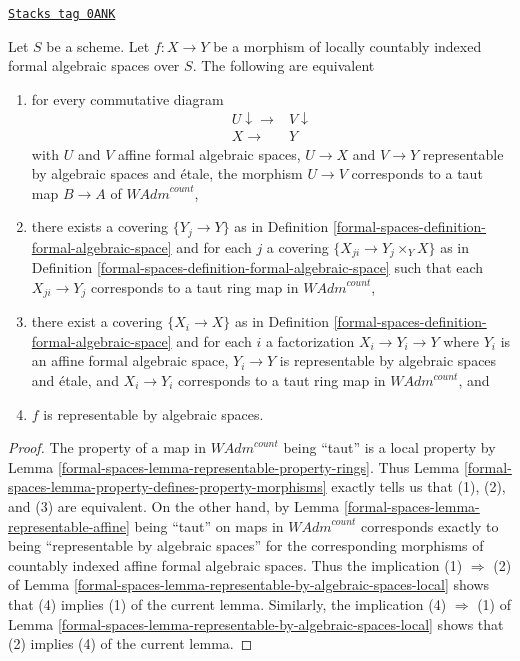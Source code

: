 \begin{lemma}
\label{formal-spaces-lemma-representable-local-property}
\href{https://stacks.math.columbia.edu/tag/0ANK}{\texttt{Stacks tag 0ANK}}

Let $S$ be a scheme. Let $f : X \to Y$ be a morphism of
locally countably indexed formal algebraic spaces over $S$.
The following are equivalent
\begin{enumerate}
\item for every commutative diagram
$$
\begin{array}{cc}U \downarrow\longrightarrow & V \downarrow \\ X \longrightarrow & Y\end{array}
$$
with $U$ and $V$ affine formal algebraic spaces, $U \to X$ and $V \to Y$
representable by algebraic spaces and \'etale, the morphism $U \to V$
corresponds to a taut map $B \to A$ of $\textit{WAdm}^{count}$,
\item there exists a covering $\{Y_j \to Y\}$ as in
Definition \ref{formal-spaces-definition-formal-algebraic-space} and for each $j$
a covering $\{X_{ji} \to Y_j \times_Y X\}$ as in
Definition \ref{formal-spaces-definition-formal-algebraic-space}
such that each $X_{ji} \to Y_j$  corresponds
to a taut ring map in $\textit{WAdm}^{count}$,
\item there exist a covering $\{X_i \to X\}$ as in
Definition \ref{formal-spaces-definition-formal-algebraic-space}
and for each $i$ a factorization $X_i \to Y_i \to Y$ where $Y_i$
is an affine formal algebraic space, $Y_i \to Y$ is representable
by algebraic spaces and \'etale, and $X_i \to Y_i$ corresponds
to a taut ring map in $\textit{WAdm}^{count}$, and
\item $f$ is representable by algebraic spaces.
\end{enumerate}
\end{lemma}

\begin{proof}
The property of a map in $\textit{WAdm}^{count}$ being
``taut'' is a local property by
Lemma \ref{formal-spaces-lemma-representable-property-rings}.
Thus Lemma \ref{formal-spaces-lemma-property-defines-property-morphisms}
exactly tells us that (1), (2), and (3) are equivalent.
On the other hand, by Lemma \ref{formal-spaces-lemma-representable-affine}
being ``taut'' on maps in $\textit{WAdm}^{count}$ corresponds exactly to being
``representable by algebraic spaces'' for the corresponding morphisms of
countably indexed affine formal algebraic spaces.
Thus the implication (1) $\Rightarrow$ (2) of
Lemma \ref{formal-spaces-lemma-representable-by-algebraic-spaces-local}
shows that (4) implies (1) of the current lemma.
Similarly, the implication (4) $\Rightarrow$ (1) of
Lemma \ref{formal-spaces-lemma-representable-by-algebraic-spaces-local}
shows that (2) implies (4) of the current lemma.
\end{proof}

